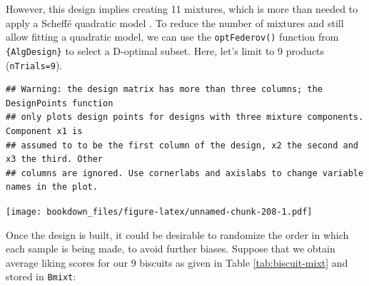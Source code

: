 \documentclass[
]{krantz}
\makeatletter
\newenvironment{Shaded}{\begin{snugshade}}{\end{snugshade}}
\newcommand{\AttributeTok}[1]{\textcolor[rgb]{0.61,0.61,0.61}{#1}}
\newcommand{\ConstantTok}[1]{\textcolor[rgb]{0,0,0}{#1}}
\newcommand{\DecValTok}[1]{\textcolor[rgb]{0.06,0.06,0.06}{#1}}
\newcommand{\FunctionTok}[1]{\textcolor[rgb]{0,0,0}{#1}}
\newcommand{\NormalTok}[1]{#1}
\newcommand{\OtherTok}[1]{\textcolor[rgb]{0.37,0.37,0.37}{#1}}
\newcommand{\SpecialCharTok}[1]{\textcolor[rgb]{0,0,0}{#1}}
\newcommand{\StringTok}[1]{\textcolor[rgb]{0.5,0.5,0.5}{#1}}
\newenvironment{kframe}{%
\medskip{}
\setlength{\fboxsep}{.8em}
 \def\at@end@of@kframe{}%
 \ifinner\ifhmode%
  \def\at@end@of@kframe{\end{minipage}}%
  \begin{minipage}{\columnwidth}%
 \fi\fi%
 \def\FrameCommand##1{\hskip\@totalleftmargin \hskip-\fboxsep
 \colorbox{shadecolor}{##1}\hskip-\fboxsep
     \hskip-\linewidth \hskip-\@totalleftmargin \hskip\columnwidth}%
 \MakeFramed {\advance\hsize-\width
   \@totalleftmargin\z@ \linewidth\hsize
   \@setminipage}}%
 {\par\unskip\endMakeFramed%
 \at@end@of@kframe}
\renewenvironment{Shaded}{\begin{kframe}}{\end{kframe}}
\makeatother
\begin{document}
However, this design implies creating 11 mixtures, which is more than needed to apply a Scheffé quadratic model \citep{Lawson2016}. To reduce the number of mixtures and still allow fitting a quadratic model, we can use the \texttt{optFederov()} function from \texttt{\{AlgDesign\}} to select a D-optimal subset. Here, let's limit to 9 products (\texttt{nTrials=9}).

\begin{Shaded}
\end{Shaded}

\begin{verbatim}
## Warning: the design matrix has more than three columns; the DesignPoints function  
## only plots design points for designs with three mixture components. Component x1 is 
## assumed to to be the first column of the design, x2 the second and x3 the third. Other 
## columns are ignored. Use cornerlabs and axislabs to change variable names in the plot.
\end{verbatim}

\texttt{[image: bookdown\_files/figure-latex/unnamed-chunk-208-1.pdf]}

Once the design is built, it could be desirable to randomize the order in which each sample is being made, to avoid further biases. Suppose that we obtain average liking scores for our 9 biscuits as given in Table \ref{tab:biscuit-mixt} and stored in \texttt{Bmixt}:
\end{document}
